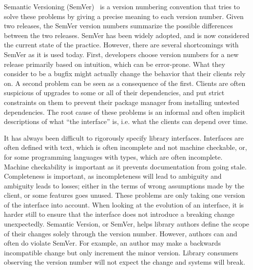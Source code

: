 Semantic Versioning (SemVer)~\cite{semver} is a version numbering
convention that tries to solve these problems by giving a precise
meaning to each version number. Given two releases, the SemVer version
numbers summarize the possible differences between the two
releases. SemVer has been widely adopted, and is now considered the
current state of the practice.
%
%
However, there are several shortcomings with SemVer as it is used
today.
%
First, developers choose version numbers for a new release primarily
based on intuition, which can be error-prone. What they consider to be
a bugfix might actually change the behavior that their clients rely
on.
%
A second problem can be seen as a consequence of the first. Clients
are often suspicious of upgrades to some or all of their dependencies,
and put strict constraints on them to prevent their package manager
from installing untested dependencies. 
%
The root cause of these problems is an informal and often implicit
descriptions of what ``the interface'' is, i.e. what the clients can
depend over time.


It has always been difficult to rigorously specify library interfaces.
Interfaces are often defined with text, which is often incomplete and not
machine checkable, or, for some programming languages with types, which are
often incomplete. Machine checkability is important as it prevents
documentation from going stale. Completeness is important, as incompleteness
will lead to ambiguity and ambiguity leads to losses; either in the terms of
wrong assumptions made by the client, or some features goes unused. These
problems are only taking one version of the interface into account. When
looking at the evolution of an interface, it is harder still to ensure that the
interface does not introduce a breaking change unexpectedly. Semantic Version, or
SemVer, helps library authors define the scope of their changes solely through
the version number. However, authors can and often do violate SemVer. For
example, an author may make a backwards incompatible change but only increment
the minor version. Library consumers observing the version number will not
expect the change and systems will break. 


